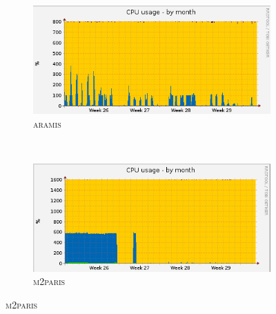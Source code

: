 \begin{figure}
        \centering
        \begin{subfigure}[b]{0.5\textwidth}
                \centering
                \includegraphics[width=\textwidth]{./images/aramis-cpu-monthm.png}
                \caption{\textsc{\large aramis}}
                \label{aramis}
        \end{subfigure}%
        ~
        \begin{subfigure}[b]{0.5\textwidth}
                \centering
                \includegraphics[width=\textwidth]{./images/m2paris-cpu-monthm.png}
                \caption{\textsc{\large m2paris}}
                \label{m2paris}
        \end{subfigure}
        

\end{figure}
